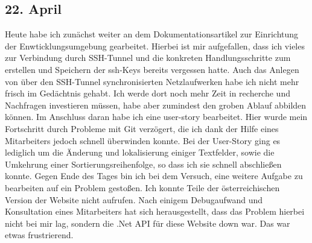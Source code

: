\subsection{22. April}
Heute habe ich zunächst weiter an dem Dokumentationsartikel zur Einrichtung der Enwticklungsumgebung gearbeitet. Hierbei ist mir aufgefallen, dass ich vieles zur Verbindung durch SSH-Tunnel und die konkreten Handlungsschritte zum erstellen und Speichern der ssh-Keys bereits vergessen hatte. Auch das Anlegen von über den SSH-Tunnel synchronisierten Netzlaufwerken habe ich nicht mehr frisch im Gedächtnis gehabt. Ich werde dort noch mehr Zeit in recherche und Nachfragen investieren müssen, habe aber zumindest den groben Ablauf abbilden können. Im Anschluss daran habe ich eine user-story bearbeitet. Hier wurde mein Fortschritt durch Probleme mit Git verzögert, die ich dank der Hilfe eines Mitarbeiters jedoch schnell überwinden konnte. Bei der User-Story ging es lediglich um die Änderung und lokalisierung einiger Textfelder, sowie die Umkehrung einer Sortierungsreihenfolge, so dass ich sie schnell abschließen konnte. Gegen Ende des Tages bin ich bei dem Versuch, eine weitere Aufgabe zu bearbeiten auf ein Problem gestoßen. Ich konnte Teile der österreichischen Version der Website nicht aufrufen. Nach einigem Debugaufwand und Konsultation eines Mitarbeiters hat sich herausgestellt, dass das Problem hierbei nicht bei mir lag, sondern die .Net API für diese Website down war. Das war etwas frustrierend. 